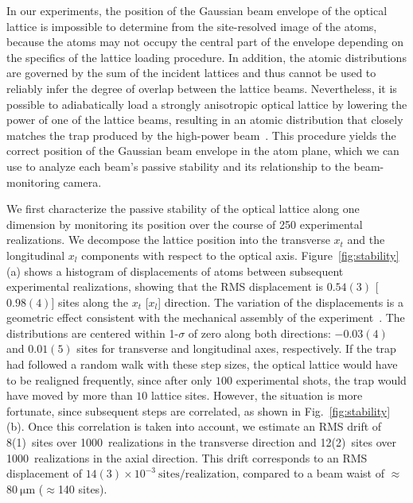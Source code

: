 \documentclass[twocolumn,aip,rsi,reprint,bibnotes]{revtex4-1}
\newcommand\unit[2]{\ensuremath{#1~\mathrm{{#2}}}}
\begin{document}
In our experiments, the position of the Gaussian beam envelope of the optical lattice is impossible to determine from the site-resolved image of the atoms, because the atoms may not occupy the central part of the envelope depending on the specifics of the lattice loading procedure.
In addition, the atomic distributions are governed by the sum of the incident lattices and thus cannot be used to reliably infer the degree of overlap between the lattice beams.
Nevertheless, it is possible to adiabatically load a strongly anisotropic optical lattice by lowering the power of one of the lattice beams, resulting in an atomic distribution that closely matches the trap produced by the high-power beam~\cite{Parsons2015}.
This procedure yields the correct position of the Gaussian beam envelope in the atom plane, which we can use to analyze each beam's passive stability and its relationship to the beam-monitoring camera.

We first characterize the passive stability of the optical lattice along one dimension by monitoring its position over the course of 250 experimental realizations.
We decompose the lattice position into the transverse $x_t$ and the longitudinal $x_l$ components with respect to the optical axis.
Figure~\ref{fig:stability}(a) shows a histogram of displacements of atoms between subsequent experimental realizations, showing that the RMS displacement is $0.54(3)$ [$0.98(4)$] sites along the $x_t$ [$x_l$] direction.
The variation of the displacements is a geometric effect consistent with the mechanical assembly of the experiment~\cite{Huber2014}.
The distributions are centered within 1-$\sigma$ of zero along both directions: $-0.03(4)$ and $0.01(5)$ sites for transverse and longitudinal axes, respectively.
If the trap had followed a random walk with these step sizes, the optical lattice would have to be realigned frequently, since after only $100$ experimental shots, the trap would have moved by more than $10$ lattice sites.
However, the situation is more fortunate, since subsequent steps are correlated, as shown in Fig.~\ref{fig:stability}(b).
Once this correlation is taken into account, we estimate an RMS drift of 8(1)~sites over 1000~realizations in the transverse direction and 12(2)~sites over 1000~realizations in the axial direction.
This drift corresponds to an RMS displacement of $\unit{14(3)\times 10^{-3}}{sites / realization}$, compared to a beam waist of $\approx$\unit{80}{\mu{}m} ($\approx$140 sites).
\end{document}
